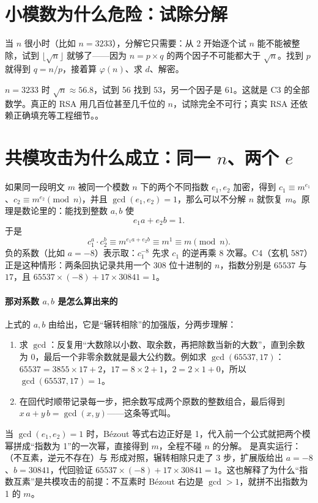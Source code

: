 \documentclass[UTF8,12pt,oneside]{ctexbook}
\begin{document}

\section{小模数为什么危险：试除分解}
当 $n$ 很小时（比如 $n = 3233$），分解它只需要：从 2 开始逐个试 $n$ 能不能被整除，试到 $\lfloor\sqrt{n}\rfloor$ 就够了——因为 $n = p \times q$ 的两个因子不可能都大于 $\sqrt{n}$。找到 $p$ 就得到 $q = n / p$，接着算 $\varphi(n)$、求 $d$、解密。

$n = 3233$ 时 $\sqrt{n} \approx 56.8$，试到 56 找到 $53$，另一个因子是 $61$。这就是 C3 的全部数学。真正的 RSA 用几百位甚至几千位的 $n$，试除完全不可行；真实 RSA 还依赖正确填充等工程细节。。


\section{共模攻击为什么成立：同一 $n$、两个 $e$}
如果同一段明文 $m$ 被同一个模数 $n$ 下的两个不同指数 $e_1, e_2$ 加密，得到 $c_1 \equiv m^{e_1}$、$c_2 \equiv m^{e_2} \pmod n$，并且 $\gcd(e_1, e_2) = 1$，那么可以不分解 $n$ 就恢复 $m$。原理是数论里的：能找到整数 $a, b$ 使
\[
e_1 a + e_2 b = 1.
\]
于是
\[
c_1^{a} \cdot c_2^{b} \equiv m^{e_1 a + e_2 b} \equiv m^{1} \equiv m \pmod n.
\]
负的系数（比如 $a = -8$）表示取：$c_1^{-8}$ 先求 $c_1$ 的逆再乘 8 次幂。C4（玄机 587）正是这种情形：两条回执记录共用一个 308 位十进制的 $n$，指数分别是 $65537$ 与 $17$，且 $65537 \times (-8) + 17 \times 30841 = 1$。

\paragraph{那对系数 $a, b$ 是怎么算出来的}上式的 $a, b$ 由给出，它是“辗转相除”的加强版，分两步理解：
\begin{enumerate}
\item {}求 $\gcd$：反复用“大数除以小数、取余数，再把除数当新的大数”，直到余数为 0，最后一个非零余数就是最大公约数。例如求 $\gcd(65537, 17)$：$65537 = 3855 \times 17 + 2$，$17 = 8 \times 2 + 1$，$2 = 2 \times 1 + 0$，所以 $\gcd(65537, 17) = 1$。
\item {}在回代时顺带记录每一步，把余数写成两个原数的整数组合，最后得到 $x\,a + y\,b = \gcd(x, y)$——这条等式叫。
\end{enumerate}
当 $\gcd(e_1, e_2) = 1$ 时，Bézout 等式右边正好是 1，代入前一个公式就把两个模幂拼成“指数为 1”的一次幂，直接得到 $m$，全程不碰 $n$ 的分解。 是真实运行：（不互素，逆元不存在）与  形成对照，辗转相除只走了 3 步，扩展版给出 $a = -8$、$b = 30841$，代回验证 $65537 \times (-8) + 17 \times 30841 = 1$。这也解释了为什么“指数互素”是共模攻击的前提：不互素时 Bézout 右边是 $\gcd > 1$，就拼不出指数为 1 的 $m$。
\end{document}
